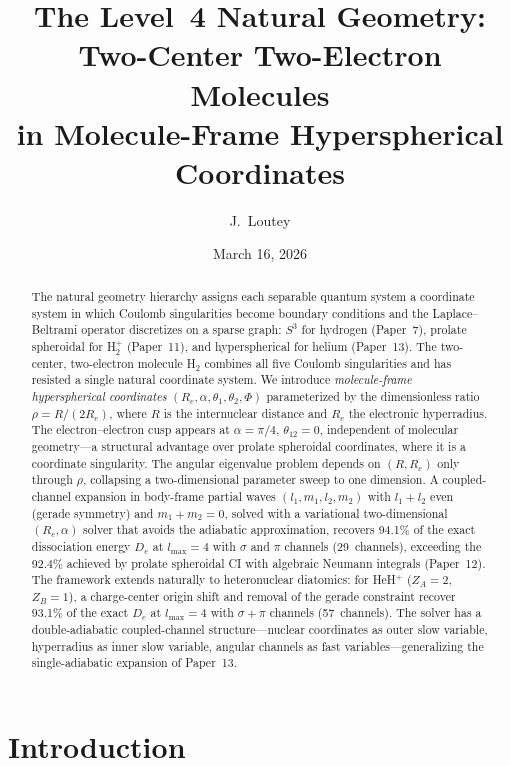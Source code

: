 \documentclass[aps,pra,twocolumn,superscriptaddress,longbibliography]{revtex4-2}
\title{The Level~4 Natural Geometry:\\
Two-Center Two-Electron Molecules\\
in Molecule-Frame Hyperspherical Coordinates}
\author{J.~Loutey}
\affiliation{Independent Researcher, Kent, Washington}
\date{March 16, 2026}
\begin{document}
\begin{abstract}
The natural geometry hierarchy assigns each separable quantum system
a coordinate system in which Coulomb singularities become boundary
conditions and the Laplace--Beltrami operator discretizes on a sparse graph:
$S^3$ for hydrogen (Paper~7), prolate spheroidal for H$_2^+$ (Paper~11),
and hyperspherical for helium (Paper~13).
The two-center, two-electron molecule H$_2$ combines all five Coulomb
singularities and has resisted a single natural coordinate system.
We introduce \emph{molecule-frame hyperspherical coordinates}
$(R_e,\alpha,\theta_1,\theta_2,\Phi)$ parameterized by the
dimensionless ratio $\rho = R/(2R_e)$, where $R$ is the internuclear
distance and $R_e$ the electronic hyperradius.
The electron--electron cusp appears at $\alpha=\pi/4$, $\theta_{12}=0$,
independent of molecular geometry---a structural advantage over
prolate spheroidal coordinates, where it is a coordinate singularity.
The angular eigenvalue problem depends on $(R,R_e)$ only through $\rho$,
collapsing a two-dimensional parameter sweep to one dimension.
A coupled-channel expansion in body-frame partial waves
$(l_1,m_1,l_2,m_2)$ with $l_1+l_2$ even (gerade symmetry) and
$m_1+m_2=0$, solved with a variational two-dimensional
$(R_e,\alpha)$ solver that avoids the adiabatic approximation,
recovers 94.1\% of the exact dissociation energy $D_e$ at
$l_{\max}=4$ with $\sigma$ and $\pi$ channels (29~channels),
exceeding the 92.4\% achieved by prolate spheroidal CI with algebraic
Neumann integrals (Paper~12).
The framework extends naturally to heteronuclear diatomics: for
HeH$^+$ ($Z_A=2$, $Z_B=1$), a charge-center origin shift and removal
of the gerade constraint recover 93.1\% of the exact $D_e$ at
$l_{\max}=4$ with $\sigma{+}\pi$ channels (57~channels).
The solver has a double-adiabatic coupled-channel structure---nuclear
coordinates as outer slow variable, hyperradius as inner slow variable,
angular channels as fast variables---generalizing the single-adiabatic
expansion of Paper~13.
\end{abstract}

\maketitle

\section{Introduction}
\label{sec:intro}
\end{document}
